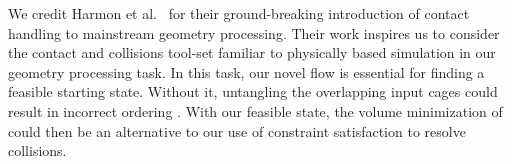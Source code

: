 


We credit Harmon et al.\  for their
ground-breaking introduction of contact handling to mainstream geometry
processing. Their work inspires us to consider the contact and collisions
tool-set familiar to physically based simulation in our geometry processing
task.
%
In this task, our novel flow is essential for finding a feasible starting
state.
%
Without it, untangling the overlapping input cages could result in incorrect
ordering \cite{Baraff:2003:UC}.
%
With our feasible state, the volume minimization of
\cite{ContactAwareModeling:2011} could then be an alternative to our use of
constraint satisfaction to resolve collisions.
